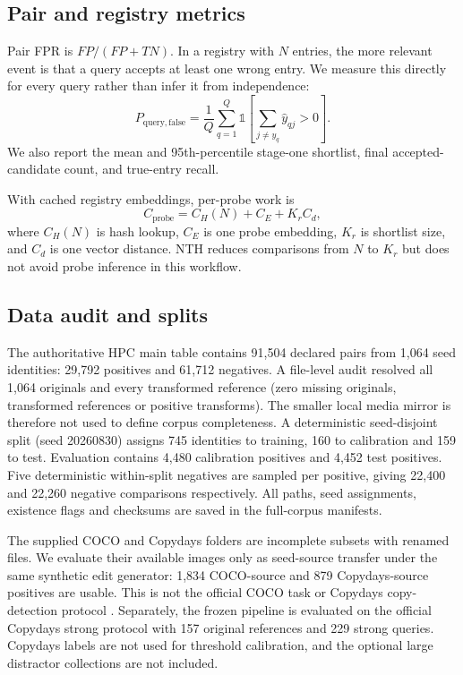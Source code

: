 \documentclass[12pt]{article}
\begin{document}
\subsection{Pair and registry metrics}

Pair FPR is $FP/(FP+TN)$. In a registry with $N$ entries, the more relevant event is that a query accepts at least one wrong entry. We measure this directly for every query rather than infer it from independence:
\begin{equation}
  P_{\mathrm{query,false}}=\frac{1}{Q}\sum_{q=1}^{Q}\mathbb{1}\!\left[\sum_{j\ne y_q}\widehat{y}_{qj}>0\right].
\end{equation}
We also report the mean and 95th-percentile stage-one shortlist, final accepted-candidate count, and true-entry recall.

With cached registry embeddings, per-probe work is
\begin{equation}
 C_{\mathrm{probe}}=C_H(N)+C_E+K_r C_d,
\end{equation}
where $C_H(N)$ is hash lookup, $C_E$ is one probe embedding, $K_r$ is shortlist size, and $C_d$ is one vector distance. NTH reduces comparisons from $N$ to $K_r$ but does not avoid probe inference in this workflow.

\subsection{Data audit and splits}

The authoritative HPC main table contains 91,504 declared pairs from 1,064 seed identities: 29,792 positives and 61,712 negatives. A file-level audit resolved all 1,064 originals and every transformed reference (zero missing originals, transformed references or positive transforms). The smaller local media mirror is therefore not used to define corpus completeness. A deterministic seed-disjoint split (seed 20260830) assigns 745 identities to training, 160 to calibration and 159 to test. Evaluation contains 4,480 calibration positives and 4,452 test positives. Five deterministic within-split negatives are sampled per positive, giving 22,400 and 22,260 negative comparisons respectively. All paths, seed assignments, existence flags and checksums are saved in the full-corpus manifests.

The supplied COCO and Copydays folders are incomplete subsets with renamed files. We evaluate their available images only as seed-source transfer under the same synthetic edit generator: 1,834 COCO-source and 879 Copydays-source positives are usable. This is not the official COCO task \cite{lin2014coco} or Copydays copy-detection protocol \cite{jegou2008copydays}. Separately, the frozen pipeline is evaluated on the official Copydays strong protocol with 157 original references and 229 strong queries. Copydays labels are not used for threshold calibration, and the optional large distractor collections are not included.
\end{document}
